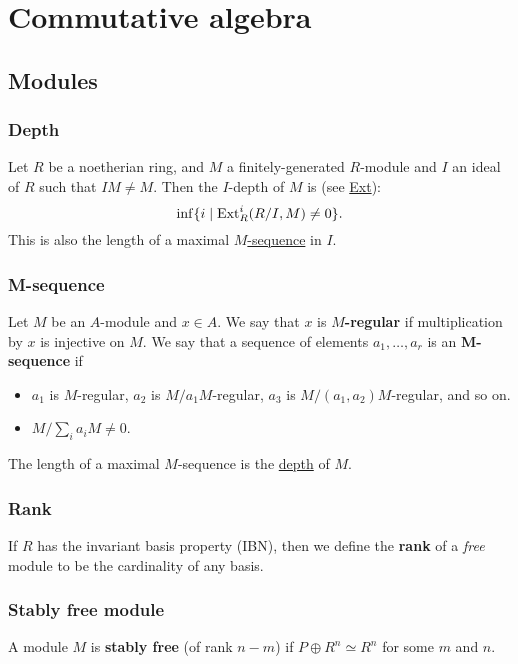 \documentclass[11pt, english]{article}
\begin{document}
\section{Commutative algebra}
\subsection{Modules}
\subsubsection{Depth}
\label{depth}
Let $R$ be a noetherian ring, and $M$ a finitely-generated $R$-module and $I$ an ideal of $R$ such that $IM \neq M$. Then the $I$-depth of $M$ is (see \hyperref[ext]{Ext}): \[\inf\{i \mid \operatorname{\mathrm{Ext}}^i_R(R/I,M) \neq 0\}.\]
This is also the length of a maximal \hyperref[msequence]{$M$-sequence} in $I$.

\subsubsection{M-sequence}
\label{msequence}

Let $M$ be an $A$-module and $x \in A$. We say that $x$ is \textbf{$M$-regular} if multiplication by $x$ is injective on $M$. We say that a sequence of elements $a_1,\ldots,a_r$ is an \textbf{M-sequence} if 
\begin{itemize}
\item $a_1$ is $M$-regular, $a_2$ is $M/a_1M$-regular, $a_3$ is $M/(a_1,a_2)M$-regular, and so on.
\item $M/\sum_i a_i M \neq 0$.
\end{itemize}
The length of a maximal $M$-sequence is the \hyperref[depth]{depth} of $M$.

\subsubsection{Rank}
\label{lengthmodule}

If $R$ has the invariant basis property (IBN), then we define the \textbf{rank} of a \emph{free} module to be the cardinality of any basis.

\subsubsection{Stably free module}
\label{stablyfree}

A module $M$ is \textbf{stably free} (of rank $n-m$) if $P \oplus R^n \simeq R^n$ for some $m$ and $n$. 
\end{document}
